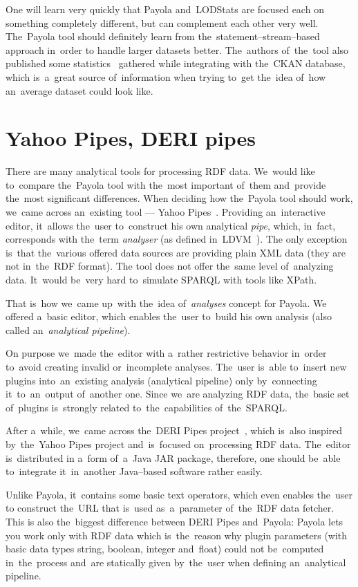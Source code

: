One will learn very quickly that Payola and~LODStats are focused each 
on something completely different, but can complement each other very well. The~Payola 
tool should definitely learn from the~statement--stream--based approach in~order 
to handle larger datasets better. The~authors of~the~tool also published
some statistics~\cite{lodstats} gathered while integrating with the~CKAN database, which is~a~great source of~information when trying to~get the~idea of~how an~average dataset 
could look like. 

\section{Yahoo Pipes, DERI pipes}
There are many analytical tools for processing RDF data. We~would like to~compare the~Payola tool with the~most important of~them and~provide the~most significant 
differences. When deciding how the~Payola tool should work, we~came 
across an~existing tool --- Yahoo 
Pipes~\cite{yahoo-pipes}. Providing an~interactive 
editor, it~allows the~user to~construct his own analytical \emph{pipe}, 
which, in~fact, corresponds with the~term \emph{analyser} (as defined in~LDVM~\cite{ldvm}).
The only exception is~that the~various offered data sources are
providing plain XML data (they are not in~the~RDF format).
The tool does not offer the~same level of~analyzing data.
It~would be~very hard to~simulate SPARQL with tools like XPath.

That is~how we~came up~with the~idea of~\emph{analyses} concept for Payola. 
We offered a~basic editor, which enables the~user to~build his own analysis
(also called an~\emph{analytical pipeline}).
 
On purpose we~made the~editor with a~rather restrictive behavior in~order to~avoid creating invalid or~incomplete analyses. The~user is~able to~insert new 
plugins into~an~existing analysis (analytical pipeline) only by~connecting it~to~an~output of~another 
one. Since we~are analyzing RDF data, the~basic set of~plugins is~strongly 
related to~the~capabilities of~the~SPARQL.

After a~while, we~came across the~DERI Pipes 
project~\cite{deri-pipes}, which is~also inspired by~the~Yahoo 
Pipes project and~is~focused on~processing RDF data. The~editor is~distributed 
in a~form of~a~Java JAR package, therefore, one should be~able to~integrate it~in~another
Java--based software rather easily.

Unlike Payola, it~contains some basic text operators, which even enables the~user  
to construct the~URL that is~used as~a~parameter of~the~RDF data fetcher. This 
is also the~biggest difference between DERI Pipes and~Payola: Payola lets 
you work only with RDF data which is~the~reason why plugin parameters (with basic data types string,
boolean, integer and~float) could not be~computed in~the~process and~are 
statically given by~the~user when defining an~analytical pipeline.


